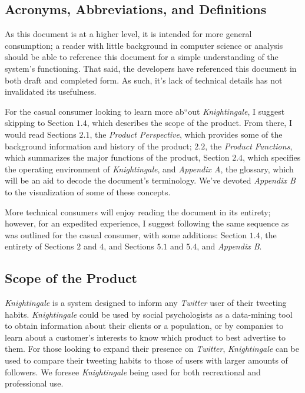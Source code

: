 \documentclass[a4paper, 12pt]{article}
\begin{document}
\subsection{Acronyms, Abbreviations, and Definitions} \label{sec:abbr}
\begin{adjustwidth}{2em}{0pt}
As this document is at a higher level, it is intended for more general consumption; a reader with little background in computer science or analysis should be able to reference this document for a simple understanding of the system’s functioning. That said, the developers have referenced this document in both draft and completed form. As such, it’s lack of technical details has not invalidated its usefulness. \newline

\noindent For the casual consumer looking to learn more ab``out \textit{Knightingale}, I suggest skipping to Section $1.4$, which describes the scope of the product. From there, I would read Sections $2.1$, the \textit{Product Perspective}, which provides some of the background information and history of the product; $2.2$, the \textit{Product Functions}, which summarizes the major functions of the product, Section $2.4$, which specifies the operating environment of \textit{Knightingale}, and \textit{Appendix A}, the glossary, which will be an aid to decode the document’s terminology. We've devoted \textit{Appendix B} to the visualization of some of these concepts. \newline

\noindent More technical consumers will enjoy reading the document in its entirety; however, for an expedited experience, I suggest following the same sequence as was outlined for the casual consumer, with some additions: Section $1.4$, the entirety of Sections $2$ and $4$, and Sections $5.1$ and $5.4$, and \textit{Appendix B}. \newline
\end{adjustwidth}

\subsection{Scope of the Product} \label{sec:scope}
\begin{adjustwidth}{2em}{0pt}
\textit{Knightingale} is a system designed to inform any \textit{Twitter} user of their tweeting habits. \textit{Knightingale} could be used by social psychologists as a data-mining tool to obtain information about their clients or a population, or by companies to learn about a customer's interests to know which product to best advertise to them. For those looking to expand their presence on \textit{Twitter}, \textit{Knightingale} can be used to compare their tweeting habits to those of users with larger amounts of followers. We foresee \textit{Knightingale} being used for both recreational and professional use.
\end{adjustwidth}
\end{document}

